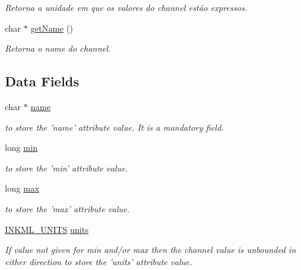 \begin{DoxyCompactItemize}
\begin{DoxyCompactList}\small\item\em Retorna a unidade em que os valores do channel estão expressos. \item\end{DoxyCompactList}\item 
char $\ast$ \hyperlink{classbr_1_1ufscar_1_1lince_1_1xpta_1_1mmi_1_1inkmllib_1_1Channel_a0c8bc29ec3a0bed2c1edcb2a142e3e8d}{getName} ()
\begin{DoxyCompactList}\small\item\em Retorna o nome do channel. \item\end{DoxyCompactList}\end{DoxyCompactItemize}
\subsection*{Data Fields}
\begin{DoxyCompactItemize}
\item 
char $\ast$ \hyperlink{classbr_1_1ufscar_1_1lince_1_1xpta_1_1mmi_1_1inkmllib_1_1Channel_afb61ee0d3d7834733557c09adf3b6bcb}{name}
\begin{DoxyCompactList}\small\item\em to store the 'name' attribute value. It is a mandatory field. \item\end{DoxyCompactList}\item 
long \hyperlink{classbr_1_1ufscar_1_1lince_1_1xpta_1_1mmi_1_1inkmllib_1_1Channel_ac0ca63bd45cff57bd599ea6a74c3e205}{min}
\begin{DoxyCompactList}\small\item\em to store the 'min' attribute value. \item\end{DoxyCompactList}\item 
long \hyperlink{classbr_1_1ufscar_1_1lince_1_1xpta_1_1mmi_1_1inkmllib_1_1Channel_a026225dffda8f84b452db591226cee12}{max}
\begin{DoxyCompactList}\small\item\em to store the 'max' attribute value. \item\end{DoxyCompactList}\item 
\hyperlink{namespacebr_1_1ufscar_1_1lince_1_1xpta_1_1mmi_1_1inkmllib_aa20053e417f8d2a79fcdc702e3e23673}{INKML\_\-UNITS} \hyperlink{classbr_1_1ufscar_1_1lince_1_1xpta_1_1mmi_1_1inkmllib_1_1Channel_ade05efe4076717c540529d5b82c81183}{units}
\begin{DoxyCompactList}\small\item\em If value not given for min and/or max then the channel value is unbounded in either direction to store the 'units' attribute value. \item\end{DoxyCompactList}\end{DoxyCompactItemize}


